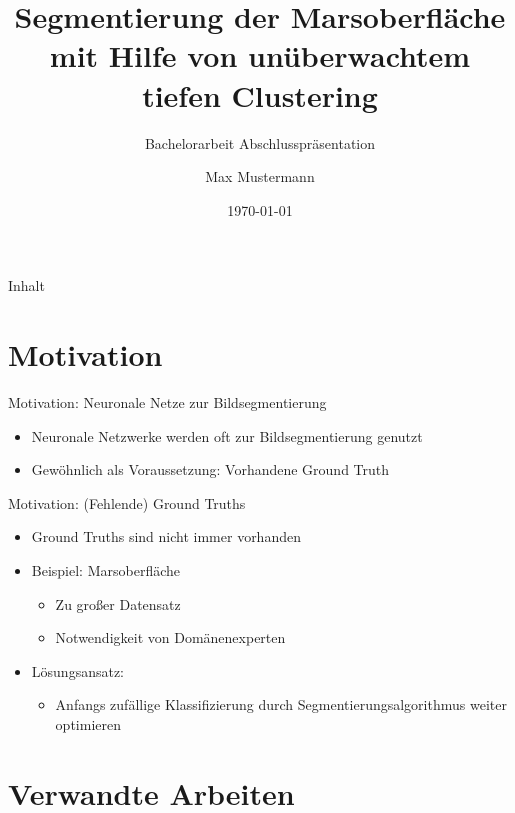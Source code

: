 \documentclass{beamer}
\title{Segmentierung der Marsoberfläche mit Hilfe von unüberwachtem tiefen Clustering}
\subtitle{Bachelorarbeit Abschlusspräsentation}
\author{Max Mustermann}
\date{\today}
\institute[TU Dortmund]{Mustererkennung,\\ Informatik XII, Technische Universität Dortmund}
\begin{document}
\maketitle

\begin{frame}{Inhalt}
\tableofcontents
\end{frame}


\section{Motivation}
\begin{frame}{Motivation: Neuronale Netze zur Bildsegmentierung}
\begin{itemize}
	\item Neuronale Netzwerke werden oft zur Bildsegmentierung genutzt
	\item Gewöhnlich als Voraussetzung: Vorhandene Ground Truth
\end{itemize}
\end{frame}

\begin{frame}{Motivation: (Fehlende) Ground Truths}
\begin{itemize}
	\item Ground Truths sind nicht immer vorhanden
	\item Beispiel: Marsoberfläche
	\begin{itemize}
		\item Zu großer Datensatz
		\item Notwendigkeit von Domänenexperten
	\end{itemize}
	\item Lösungsansatz:
	\begin{itemize}
		\item Anfangs zufällige Klassifizierung durch Segmentierungsalgorithmus weiter optimieren
	\end{itemize}
\end{itemize}
\end{frame}


\section{Verwandte Arbeiten}
\end{document}
